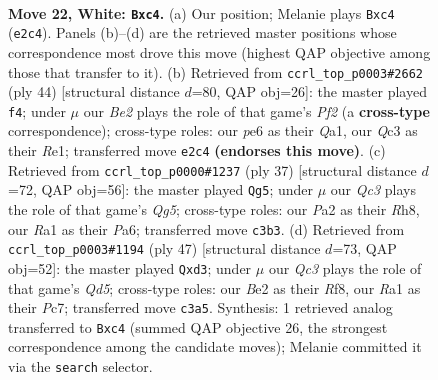 \documentclass[11pt]{article}
\begin{document}
\clearpage

\begin{figure}[p]\centering
\begin{subfigure}{0.46\textwidth}\centering
\resizebox{\linewidth}{!}{%
\newchessgame
\chessboard[
  setfen={4r1k1/pp5p/3bpqp1/4n3/2r5/2Q3P1/PP2BP1P/R3R1K1 w - - 0 22},
  showmover=false,
  pgfstyle=straightmove, color=movearrow, markmove={e2-c4}
]}
\caption{}
\end{subfigure}\hfill
\begin{subfigure}{0.46\textwidth}\centering
\resizebox{\linewidth}{!}{%
\newchessgame
\chessboard[
  setfen={r1b1rk2/pp5p/3q2p1/3Bnp2/2P5/6P1/P4P1P/Q3RRK1 w - - 2 23},
  showmover=false,
  pgfstyle=straightmove, color=movearrow, markmove={f2-f4}
]}
\caption{}
\end{subfigure}
\\[4pt]
\begin{subfigure}{0.46\textwidth}\centering
\resizebox{\linewidth}{!}{%
\newchessgame
\chessboard[
  setfen={2kr3r/2p1n2p/p2p1pb1/N1p5/5Rq1/2N5/PPPQ2PP/R5K1 b - - 6 19},
  showmover=false,
  pgfstyle=straightmove, color=movearrow, markmove={g4-g5}
]}
\caption{}
\end{subfigure}\hfill
\begin{subfigure}{0.46\textwidth}\centering
\resizebox{\linewidth}{!}{%
\newchessgame
\chessboard[
  setfen={3r1rk1/2p3p1/p6p/1p2p3/3q4/1P1BN2P/PR4P1/2B1Q1K1 b - - 0 24},
  showmover=false,
  pgfstyle=straightmove, color=movearrow, markmove={d4-d3}
]}
\caption{}
\end{subfigure}
\caption{\textbf{Move 22, White: \texttt{Bxc4}.} (a) Our position; Melanie plays \texttt{Bxc4} (\texttt{e2c4}). Panels (b)--(d) are the retrieved master positions whose correspondence most drove this move (highest QAP objective among those that transfer to it). (b) Retrieved from \texttt{ccrl\_top\_p0003\#2662} (ply 44) [structural distance $d$=80, QAP obj=26]: the master played \texttt{f4}; under $\mu$ our \emph{Be2} plays the role of that game's \emph{Pf2} (a \textbf{cross-type} correspondence); cross-type roles: our \emph{p}e6 as their \emph{Q}a1, our \emph{Q}c3 as their \emph{R}e1; transferred move \texttt{e2c4} \textbf{(endorses this move)}. (c) Retrieved from \texttt{ccrl\_top\_p0000\#1237} (ply 37) [structural distance $d$=72, QAP obj=56]: the master played \texttt{Qg5}; under $\mu$ our \emph{Qc3} plays the role of that game's \emph{Qg5}; cross-type roles: our \emph{P}a2 as their \emph{R}h8, our \emph{R}a1 as their \emph{P}a6; transferred move \texttt{c3b3}. (d) Retrieved from \texttt{ccrl\_top\_p0003\#1194} (ply 47) [structural distance $d$=73, QAP obj=52]: the master played \texttt{Qxd3}; under $\mu$ our \emph{Qc3} plays the role of that game's \emph{Qd5}; cross-type roles: our \emph{B}e2 as their \emph{R}f8, our \emph{R}a1 as their \emph{P}c7; transferred move \texttt{c3a5}. Synthesis: 1 retrieved analog transferred to \texttt{Bxc4} (summed QAP objective 26, the strongest correspondence among the candidate moves); Melanie committed it via the \texttt{search} selector.}
\label{fig:thought-m42}
\end{figure}
\end{document}
